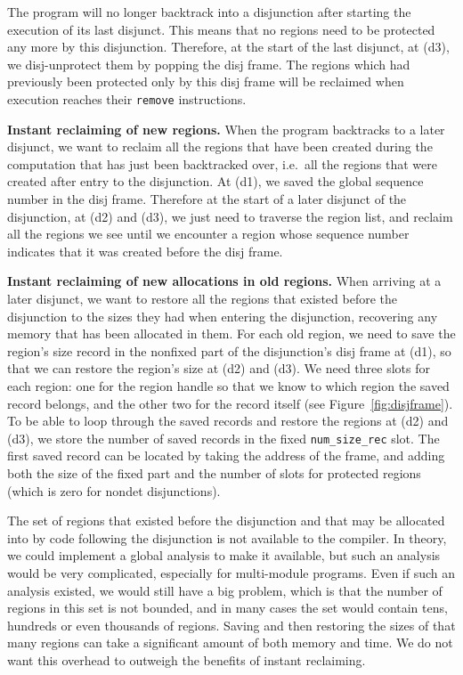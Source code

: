 \documentclass{tlp}
\newcommand{\code}[1]{{\tt#1}}
\begin{document}
The program will no longer backtrack into a disjunction
after starting the execution of its last disjunct.
This means that no regions need to be protected any more by this disjunction.
Therefore, at the start of the last disjunct, at (d3),
we disj-unprotect them by popping the disj frame.
The regions which had previously been protected only by this disj frame
will be reclaimed when execution reaches their \code{remove} instructions.

\noindent\textbf{Instant reclaiming of new regions.}
When the program backtracks to a later disjunct,
we want to reclaim all the regions that have been created
during the computation that has just been backtracked over,
i.e.\ all the regions that were created after entry to the disjunction.
At (d1), we saved the global sequence number in the disj frame.
Therefore at the start of a later disjunct of the disjunction,
at (d2) and (d3),
we just need to traverse the region list,
and reclaim all the regions we see until we encounter a region
whose sequence number indicates that it was created before the disj frame.

\noindent\textbf{Instant reclaiming of new allocations in old regions.}
When arriving at a later disjunct,
we want to restore all the regions that existed before the disjunction
to the sizes they had when entering the disjunction,
recovering any memory that has been allocated in them.
For each old region,
we need to save the region's size record
in the nonfixed part of the disjunction's disj frame at (d1),
so that we can restore the region's size at (d2) and (d3).
We need three slots for each region:
one for the region handle so that we know
to which region the saved record belongs,
and the other two for the record itself (see Figure~\ref{fig:disjframe}).
To be able to loop through the saved records
and restore the regions at (d2) and (d3),
we store the number of saved records in the fixed \code{num\_size\_rec} slot.
The first saved record can be located by taking the address of the frame,
and adding both the size of the fixed part
and the number of slots for protected regions
(which is zero for nondet disjunctions).

The set of regions that existed before the disjunction
and that may be allocated into by code following the disjunction
is not available to the compiler.
In theory, we could implement a global analysis to make it available,
but such an analysis would be very complicated,
especially for multi-module programs.
Even if such an analysis existed,
we would still have a big problem,
which is that the number of regions in this set is not bounded,
and in many cases the set would contain
tens, hundreds or even thousands of regions.
Saving and then restoring the sizes of that many regions
can take a significant amount of both memory and time.
We do not want this overhead to outweigh the benefits of instant reclaiming.
\end{document}
